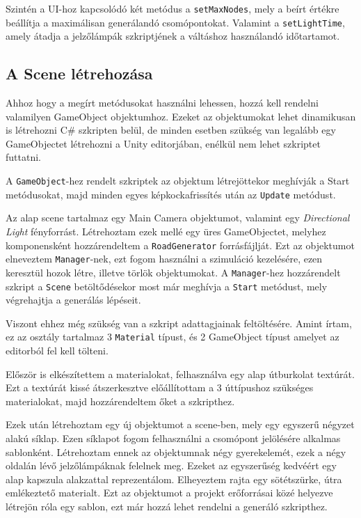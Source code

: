 Szintén a UI-hoz kapcsolódó két metódus a \texttt{setMaxNodes}, mely a beírt értékre beállítja a maximálisan generálandó csomópontokat. Valamint a \texttt{setLightTime}, amely átadja a jelzőlámpák szkriptjének a váltáshoz használandó időtartamot.

\subsection{A Scene létrehozása}

Ahhoz hogy a megírt metódusokat használni lehessen, hozzá kell rendelni valamilyen GameObject objektumhoz. Ezeket az objektumokat lehet dinamikusan is létrehozni C\# szkripten belül, de minden esetben szükség van legalább egy GameObjectet létrehozni a Unity editorjában, enélkül nem lehet szkriptet futtatni.

A \texttt{GameObject}-hez rendelt szkriptek az objektum létrejöttekor meghívják a Start metódusokat, majd minden egyes képkockafrissítés után az \texttt{Update} metódust.

Az alap scene tartalmaz egy Main Camera objektumot, valamint egy \textit{Directional Light} fényforrást. Létrehoztam ezek mellé egy üres GameObjectet, melyhez komponensként hozzárendeltem a \texttt{RoadGenerator} forrásfájlját. Ezt az objektumot elneveztem \texttt{Manager}-nek, ezt fogom használni a szimuláció kezelésére, ezen keresztül hozok létre, illetve törlök objektumokat. A \texttt{Manager}-hez hozzárendelt szkript a \texttt{Scene} betöltődésekor most már meghívja a \texttt{Start} metódust, mely végrehajtja a generálás lépéseit.

Viszont ehhez még szükség van a szkript adattagjainak feltöltésére. Amint írtam, ez az osztály tartalmaz 3 \texttt{Material} típust, és 2 GameObject típust amelyet az editorból fel kell tölteni. 

Először is elkészítettem a materialokat, felhasználva egy alap útburkolat textúrát. Ezt a textúrát kissé átszerkesztve előállítottam a 3 úttípushoz szükséges materialokat, majd hozzárendeltem őket a szkripthez.

Ezek után létrehoztam egy új objektumot a scene-ben, mely egy egyszerű négyzet alakú síklap. Ezen síklapot fogom felhasználni a csomópont jelölésére alkalmas sablonként. Létrehoztam ennek az objektumnak négy gyerekelemét, ezek a négy oldalán lévő jelzőlámpáknak felelnek meg. Ezeket az egyszerűség kedvéért egy alap kapszula alakzattal reprezentálom. Elheyeztem rajta egy sötétszürke, útra emlékeztető materialt. Ezt az objektumot a projekt erőforrásai közé helyezve létrejön róla egy sablon, ezt már hozzá lehet rendelni a generáló szkripthez.

